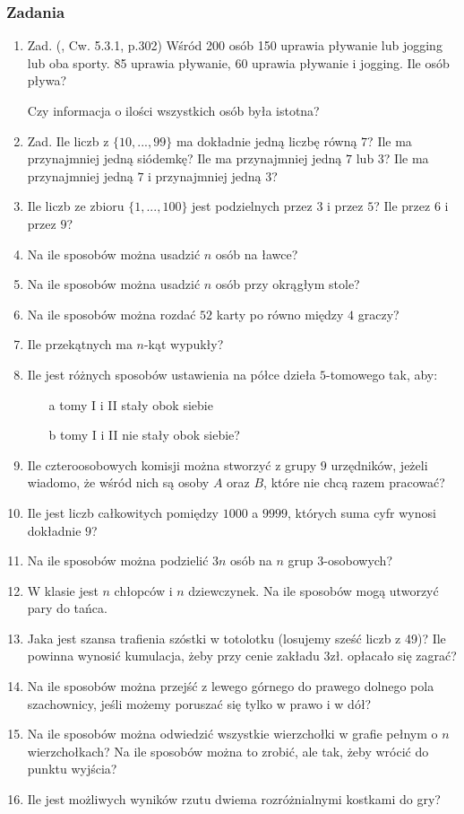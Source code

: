 \documentclass[12pt]{article}
\begin{document}
\subsubsection{Zadania}
\begin{enumerate}
	\item 
	Zad. (\cite{MD}, Cw. 5.3.1, p.302)
	Wśród 200 osób 150 uprawia pływanie lub jogging lub oba sporty.
	85 uprawia pływanie, 60 uprawia pływanie i jogging. 
	Ile osób pływa?
	
	Czy informacja o ilości wszystkich osób była istotna?
	
	\item 
	Zad. 
	Ile liczb z $\{10, ..., 99\}$ ma dokładnie jedną liczbę równą $7$?
	Ile ma przynajmniej jedną siódemkę?
	Ile ma przynajmniej jedną $7$ lub $3$?
	Ile ma przynajmniej jedną $7$ i przynajmniej jedną $3$?
	
	\item 
	Ile liczb ze zbioru $\{1,...,100\}$ jest podzielnych przez $3$ i przez $5$?
	Ile przez $6$ i przez $9$?
	
	\item 
	 Na ile sposobów można usadzić $n$ osób na ławce?
	 \item 
	Na ile sposobów można usadzić $n$ osób przy okrągłym stole?
	\item  Na ile sposobów można rozdać $52$ karty po równo między $4$ graczy?
	\item Ile przekątnych ma $n$-kąt wypukły?
    \item Ile jest różnych sposobów ustawienia na półce dzieła $5$-tomowego tak, aby:
    \begin{itemize} 
	\item[a] tomy I i II stały obok siebie
	\item[b] tomy I i II nie stały obok siebie?
	\end{itemize} 
	\item Ile czteroosobowych komisji można stworzyć z grupy $9$ urzędników, jeżeli
	wiadomo, że wśród nich są osoby $A$ oraz $B$, które nie chcą razem pracować?
	\item Ile jest liczb całkowitych pomiędzy $1000$ a $9999$, których suma cyfr wynosi
	dokładnie $9$?
	\item  Na ile sposobów można podzielić $3n$ osób na $n$ grup $3$-osobowych?
	\item W klasie jest $n$ chłopców i $n$ dziewczynek. Na ile sposobów mogą utworzyć pary do tańca. 
	\item Jaka jest szansa trafienia szóstki w totolotku (losujemy sześć liczb z 49)? Ile powinna wynosić kumulacja, 
	 żeby przy cenie zakładu 3zł. opłacało się zagrać?
    \item Na ile sposobów można przejść z lewego górnego do prawego dolnego pola szachownicy, jeśli możemy poruszać się
    tylko w prawo i w dół?
    \item Na ile sposobów można odwiedzić wszystkie wierzchołki
    w grafie pełnym o $n$ wierzchołkach? 
    Na ile sposobów można to zrobić, ale tak, żeby wrócić do punktu wyjścia?
    \item Ile jest możliwych wyników rzutu dwiema rozróżnialnymi 
    kostkami do gry?
    

\end{enumerate}
\end{document}
